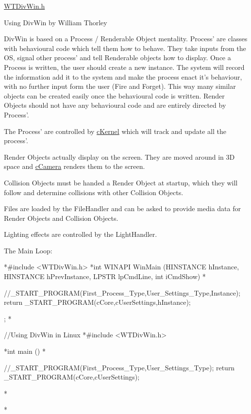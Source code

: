 \hyperlink{_w_t_div_win_8h_source}{WTDivWin.h}

Using DivWin by William Thorley

DivWin is based on a Process / Renderable Object mentality. Process' are classes with behavioural code which tell them how to behave. They take inputs from the OS, signal other process' and tell Renderable objects how to display. Once a Process is written, the user should create a new instance. The system will record the information add it to the system and make the process enact it's behaviour, with no further input form the user (Fire and Forget). This way many similar objects can be created easily once the behavioural code is written. Render Objects should not have any behavioural code and are entirely directed by Process'.

The Process' are controlled by \hyperlink{classc_kernel}{cKernel} which will track and update all the process'.

Render Objects actually display on the screen. They are moved around in 3D space and \hyperlink{classc_camera}{cCamera} renders them to the screen.

Collision Objects must be handed a Render Object at startup, which they will follow and determine collisions with other Collision Objects.

Files are loaded by the FileHandler and can be asked to provide media data for Render Objects and Collision Objects.

Lighting effects are controlled by the LightHandler.

The Main Loop:


\begin{DoxyCode}
*#include <WTDivWin.h>
*int WINAPI WinMain (HINSTANCE hInstance,
                    HINSTANCE hPrevInstance,
                    LPSTR lpCmdLine,
                    int iCmdShow)
*{
 //_START_PROGRAM(First_Process_Type,User_Settings_Type,Instance);  
 return _START_PROGRAM(cCore,cUserSettings,hInstance);

};
*
\end{DoxyCode}
 
\begin{DoxyCode}
 //Using DivWin in Linux
*#include <WTDivWin.h>

*int main ()
*{
  //_START_PROGRAM(First_Process_Type,User_Settings_Type); 
  return _START_PROGRAM(cCore,cUserSettings);

*}
*
\end{DoxyCode}


